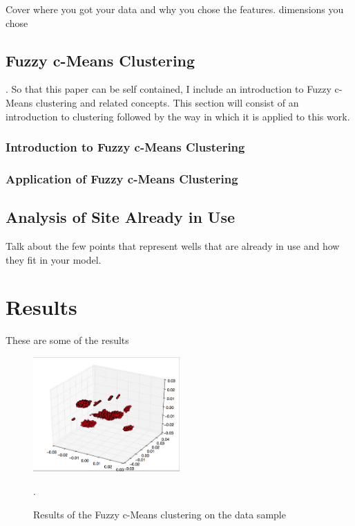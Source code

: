 \documentclass[a4paper, 12pt]{article}
\begin{document}
Cover where you got your data and why you chose the features. dimensions you chose



\subsection{Fuzzy c-Means Clustering}\label{fuzz}.
So that this paper can be self contained, I include an introduction to Fuzzy c-Means clustering and related concepts. This section will consist of an introduction to clustering followed by the way in which it is applied to this work.

\subsubsection{Introduction to Fuzzy c-Means Clustering}


\subsubsection{Application of Fuzzy c-Means Clustering} 

\subsection{Analysis of Site Already in Use}
Talk about the few points that represent wells that are already in use and how they fit in your model. 


\section{Results}
These are some of the results

\begin{figure}%
  \centering
  \includegraphics[width=0.5\textwidth]{clusters}
  \caption{\label{clusters} Results of the Fuzzy c-Means clustering on the data sample}. 
\end{figure}
\end{document}
